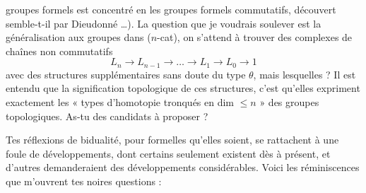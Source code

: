 \documentclass[11pt,a4paper]{article}
\begin{document}
groupes formels est concentré en les groupes formels commutatifs, découvert semble-t-il par Dieudonné …). La question que je voudrais soulever est la généralisation aux groupes dans ($n$-cat), on s'attend à trouver des complexes de chaînes non commutatifs
\[
L_n \to L_{n-1} \to \dots \to L_1 \to L_0 \to 1
\]
avec des structures supplémentaires sans doute du type $\theta$, mais lesquelles ? Il est entendu que la signification topologique de ces structures, c'est qu'elles expriment exactement les « types d'homotopie tronqués en dim $\leqslant n$ » des groupes topologiques.  As-tu des candidats à proposer ?

Tes réflexions de bidualité, pour formelles qu'elles soient, se rattachent à une foule de développements, dont certains seulement existent dès à présent, et d'autres demanderaient des développements considérables. Voici les réminiscences que m'ouvrent tes noires questions :
\end{document}
